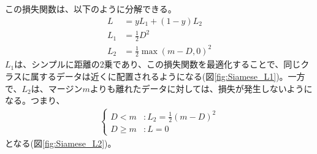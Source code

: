 \documentclass{ltjsarticle}
\begin{document}
この損失関数は、以下のように分解できる。
\begin{align}
  L &= yL_1 + (1-y)L_2\\
  L_1 &= \frac{1}{2}D^2\\
  L_2 &= \frac{1}{2}\max(m-D, 0)^2
\end{align}
$L_1$は、シンプルに距離の2乗であり、この損失関数を最適化することで、同じクラスに属するデータは近くに配置されるようになる(図\ref{fig:Siamese_L1})。一方で、$L_2$は、マージン$m$よりも離れたデータに対しては、損失が発生しないようになる。つまり、
\begin{align}
  \begin{cases}
    D < m & : L_2 = \frac{1}{2}(m-D)^2\\ 
    D \geq m & : L = 0
  \end{cases}
\end{align}
となる(図\ref{fig:Siamese_L2})。
\end{document}
